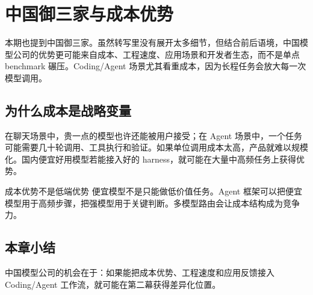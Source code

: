 \section{中国御三家与成本优势}

本期也提到中国御三家。虽然转写里没有展开太多细节，但结合前后语境，中国模型公司的优势更可能来自成本、工程速度、应用场景和开发者生态，而不是单点 benchmark 碾压。Coding/Agent 场景尤其看重成本，因为长程任务会放大每一次模型调用。

\subsection{为什么成本是战略变量}

在聊天场景中，贵一点的模型也许还能被用户接受；在 Agent 场景中，一个任务可能需要几十轮调用、工具执行和验证。如果单位调用成本太高，产品就难以规模化。国内便宜好用模型若能接入好的 harness，就可能在大量中高频任务上获得优势。

\begin{importantbox}{成本优势不是低端优势}
便宜模型不是只能做低价值任务。Agent 框架可以把便宜模型用于高频步骤，把强模型用于关键判断。多模型路由会让成本结构成为竞争力。
\end{importantbox}

\subsection{本章小结}

中国模型公司的机会在于：如果能把成本优势、工程速度和应用反馈接入 Coding/Agent 工作流，就可能在第二幕获得差异化位置。

